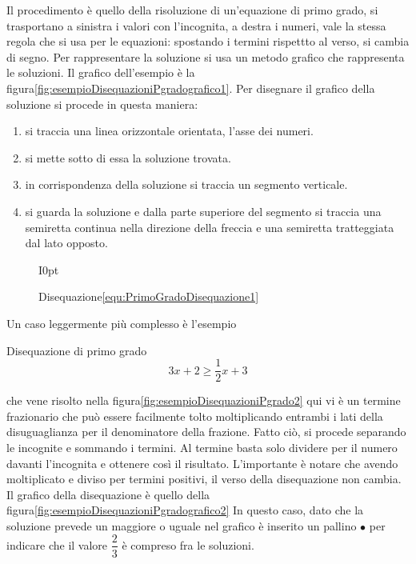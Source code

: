 Il procedimento è  quello della risoluzione di un'equazione di primo grado, si trasportano a sinistra i valori con l'incognita, a destra i numeri, vale la stessa regola che si usa per le equazioni: spostando i termini rispettto al verso, si cambia di segno. Per rappresentare la soluzione si usa un metodo grafico che rappresenta le soluzioni. Il grafico dell'esempio è la figura\nobs\vref{fig:esempioDisequazioniPgradografico1}. Per disegnare il grafico della soluzione si procede in questa maniera: 
\begin{procedurat}{}{}
\begin{enumerate}
	\item si traccia una linea orizzontale orientata, l'asse dei numeri.
	\item si mette sotto di essa la soluzione trovata.
	\item in corrispondenza della soluzione si traccia un segmento verticale.
	\item  si guarda la soluzione e dalla parte superiore del segmento si traccia una semiretta continua nella direzione della freccia e una semiretta tratteggiata dal lato opposto.
\end{enumerate}
\end{procedurat}
\begin{figure}{I}{0pt}
	\centering
	\captionsetup{format=grafico,list=no}
	\caption[]{Disequazione\nobs\vref{equ:PrimoGradoDisequazione1}}
	\label{fig:esempioDisequazioniPgradografico1}
\end{figure}\par Un caso leggermente più complesso è l'esempio
\begin{esempiot}{Disequazione di primo grado}{}
\begin{equation}
 3x+2\geq\dfrac{1}{2}x+3\label{equ:PrimoGradoDisequazione2}
\end{equation}
\end{esempiot}
  che vene risolto nella figura\nobs\vref{fig:esempioDisequazioniPgrado2} qui vi è un termine frazionario che può essere facilmente tolto moltiplicando entrambi i lati della disuguaglianza per il denominatore della frazione. Fatto ciò, si procede separando le incognite e sommando i termini. Al termine basta solo dividere per il numero davanti l'incognita e ottenere così il risultato. L'importante è notare che avendo moltiplicato e diviso per termini positivi, il verso della disequazione non cambia. Il grafico della disequazione è quello della figura\nobs\vref{fig:esempioDisequazioniPgradografico2} In questo caso, dato che la soluzione prevede un maggiore o uguale nel grafico è inserito un pallino $\bullet$ per indicare che il valore $\dfrac{2}{3}$ è compreso fra le soluzioni.\par
